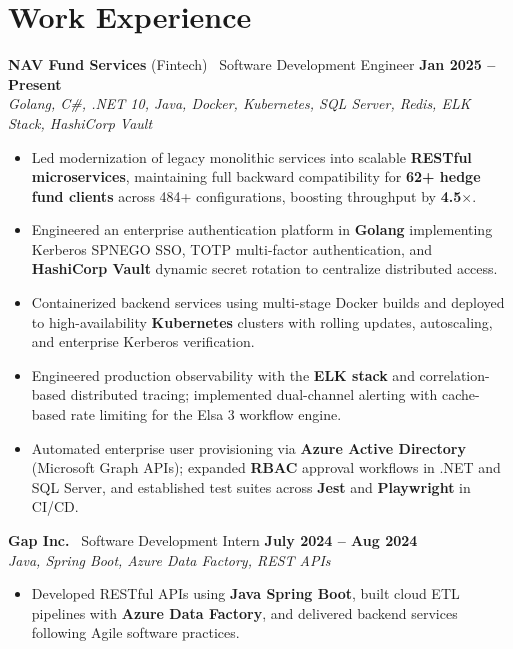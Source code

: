 \documentclass[a4paper,11pt]{article}
\begin{document}
\section*{Work Experience}
\textbf{NAV Fund Services} (Fintech) \textbar\ Software Development Engineer \hfill \textbf{Jan 2025 -- Present} \\
{\small\textit{Golang, C\#, .NET 10, Java, Docker, Kubernetes, SQL Server, Redis, ELK Stack, HashiCorp Vault}}\par\vspace{1.5pt}
\begin{itemize}
 \item Led modernization of legacy monolithic services into scalable \textbf{RESTful microservices}, maintaining full backward compatibility for \textbf{62+ hedge fund clients} across 484+ configurations, boosting throughput by \textbf{4.5$\times$}.
 \item Engineered an enterprise authentication platform in \textbf{Golang} implementing Kerberos SPNEGO SSO, TOTP multi-factor authentication, and \textbf{HashiCorp Vault} dynamic secret rotation to centralize distributed access.
 \item Containerized backend services using multi-stage Docker builds and deployed to high-availability \textbf{Kubernetes} clusters with rolling updates, autoscaling, and enterprise Kerberos verification.
 \item Engineered production observability with the \textbf{ELK stack} and correlation-based distributed tracing; implemented dual-channel alerting with cache-based rate limiting for the Elsa 3 workflow engine.
 \item Automated enterprise user provisioning via \textbf{Azure Active Directory} (Microsoft Graph APIs); expanded \textbf{RBAC} approval workflows in .NET and SQL Server, and established test suites across \textbf{Jest} and \textbf{Playwright} in CI/CD.
\end{itemize}

\vspace{6.5pt}
\textbf{Gap Inc.} \textbar\ Software Development Intern \hfill \textbf{July 2024 -- Aug 2024} \\
{\small\textit{Java, Spring Boot, Azure Data Factory, REST APIs}}\par\vspace{1.5pt}
\begin{itemize}
 \item Developed RESTful APIs using \textbf{Java Spring Boot}, built cloud ETL pipelines with \textbf{Azure Data Factory}, and delivered backend services following Agile software practices.
\end{itemize}
\end{document}
